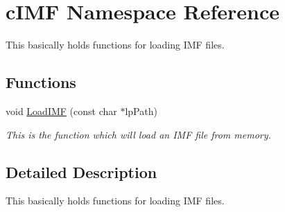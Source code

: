 \hypertarget{namespacec_i_m_f}{
\section{cIMF Namespace Reference}
\label{namespacec_i_m_f}
}


This basically holds functions for loading IMF files.  


\subsection*{Functions}
\begin{DoxyCompactItemize}
\item 
\hypertarget{namespacec_i_m_f_a07eaddf0810b846a0190f18e9969f590}{
void \hyperlink{namespacec_i_m_f_a07eaddf0810b846a0190f18e9969f590}{LoadIMF} (const char $\ast$lpPath)}
\label{namespacec_i_m_f_a07eaddf0810b846a0190f18e9969f590}

\begin{DoxyCompactList}\small\item\em This is the function which will load an IMF file from memory. \end{DoxyCompactList}\end{DoxyCompactItemize}


\subsection{Detailed Description}
This basically holds functions for loading IMF files. 
